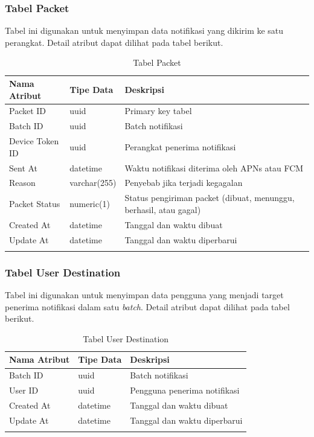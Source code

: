 \subsubsection{Tabel Packet}
\par Tabel ini digunakan untuk menyimpan data notifikasi yang dikirim ke satu perangkat. Detail atribut dapat dilihat pada tabel berikut.
\begin{longtable}{|p{2.5cm}|p{2cm}|p{4.5cm}|}
    \hline
    \textbf{Nama Atribut} & \textbf{Tipe Data} & \textbf{Deskripsi} \\ \hline
    Packet ID & uuid & Primary key tabel \\ \hline
    Batch ID & uuid & Batch notifikasi \\ \hline
    Device Token ID & uuid & Perangkat penerima notifikasi \\ \hline
    Sent At & datetime & Waktu notifikasi diterima oleh APNs atau FCM \\ \hline
    Reason & varchar(255) & Penyebab jika terjadi kegagalan \\ \hline
    Packet Status & numeric(1) & Status pengiriman packet (dibuat, menunggu, berhasil, atau gagal) \\ \hline
    Created At & datetime & Tanggal dan waktu dibuat \\ \hline
    Update At & datetime & Tanggal dan waktu diperbarui \\ \hline
    \caption{Tabel Packet}
\end{longtable}

\subsubsection{Tabel User Destination}
\par Tabel ini digunakan untuk menyimpan data pengguna yang menjadi target penerima notifikasi dalam satu \textit{batch}. Detail atribut dapat dilihat pada tabel berikut.
\begin{longtable}{|p{2.5cm}|p{2cm}|p{4.5cm}|}
    \hline
    \textbf{Nama Atribut} & \textbf{Tipe Data} & \textbf{Deskripsi} \\ \hline
    Batch ID & uuid & Batch notifikasi \\ \hline
    User ID & uuid & Pengguna penerima notifikasi \\ \hline
    Created At & datetime & Tanggal dan waktu dibuat \\ \hline
    Update At & datetime & Tanggal dan waktu diperbarui \\ \hline
    \caption{Tabel User Destination}
\end{longtable}

